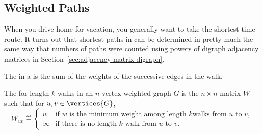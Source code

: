 \subsection{Weighted Paths}
When you drive home for vacation, you generally want to take the
shortest-time route.  It turns out that shortest paths in can be
determined in pretty much the same way that numbers of paths were
counted using powers of digraph adjacency matrices in
Section~\ref{sec:adjacency-matrix-digraph}.

\begin{definition}\label{def:5H}
  The   in a  is the sum of the weights of
  the successive edges in the walk.
\end{definition}

\iffalse
\arm{cut}
There is good news and bad news to report on this front.  The good
news is that it is not very hard to find a shortest path.  The bad
news is that you can't win one of those million dollar prizes for
doing it.

In fact, there are several good algorithms known for finding a shortest
path between nodes $u$ and $v$ in an $n$-node graph $G$.  The simplest to
explain (but not quite the fastest) is to compute \arm{revised to include
  stopping condition at $n$} the successive powers of $A_G$ one by one up
to the $n$th, watching for the first power at which the $uv$th entry is
nonzero.  That's because Theorem~\ref{thm:CkDm} implies that the length of
the shortest path, if any, between $u$ and~$v$ will be the smallest
value~$k$ for which $(A_G)_{uv}^k$ is nonzero, and if there is a shortest
path, its length will be $\leq n$.
\fi

\begin{definition}
  The  for length $k$ walks in an $n$-vertex
  weighted graph $G$ is the $n \times n$ matrix $W$ such that for $u,v \in \vertices{G}$,
\begin{equation}\label{def:weight_matrix}
W_{uv} \eqdef
\begin{cases} w & \text{if $w$ is the minimum weight among length $k$
                            walks from $u$ to $v$},\\
              \infty & \text{if there is no length $k$ walk from $u$ to $v$}.
\end{cases}
\end{equation}
\end{definition}

